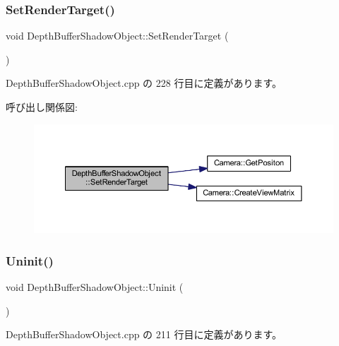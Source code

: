 \subsubsection{\texorpdfstring{Set\+Render\+Target()}{SetRenderTarget()}}
{\footnotesize\ttfamily void Depth\+Buffer\+Shadow\+Object\+::\+Set\+Render\+Target (\begin{DoxyParamCaption}{ }\end{DoxyParamCaption})\hspace{0.3cm}{\ttfamily [static]}}



 Depth\+Buffer\+Shadow\+Object.\+cpp の 228 行目に定義があります。

呼び出し関係図\+:
\nopagebreak
\begin{figure}[H]
\begin{center}
\leavevmode
\includegraphics[width=350pt]{class_depth_buffer_shadow_object_ac575084492645de134c6f1990ed7d2dc_cgraph}
\end{center}
\end{figure}
\mbox{\label{class_depth_buffer_shadow_object_a6f5e6542143cffef6b7a9e69f6c9cd94}} 
\subsubsection{\texorpdfstring{Uninit()}{Uninit()}}
{\footnotesize\ttfamily void Depth\+Buffer\+Shadow\+Object\+::\+Uninit (\begin{DoxyParamCaption}{ }\end{DoxyParamCaption})\hspace{0.3cm}{\ttfamily [static]}}



 Depth\+Buffer\+Shadow\+Object.\+cpp の 211 行目に定義があります。



